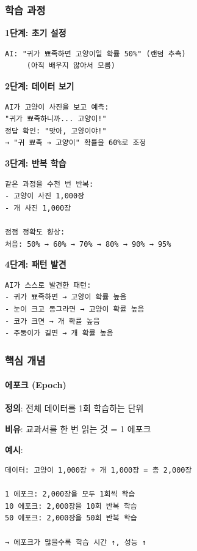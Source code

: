 \documentclass[a4paper, 11pt]{article}
\begin{document}
\hypertarget{uxd559uxc2b5-uxacfcuxc815-1}{%
\subsubsection{학습 과정}\label{uxd559uxc2b5-uxacfcuxc815-1}}

\textbf{1단계: 초기 설정}

\begin{verbatim}
AI: "귀가 뾰족하면 고양이일 확률 50%" (랜덤 추측)
     (아직 배우지 않아서 모름)
\end{verbatim}

\textbf{2단계: 데이터 보기}

\begin{verbatim}
AI가 고양이 사진을 보고 예측:
"귀가 뾰족하니까... 고양이!"
정답 확인: "맞아, 고양이야!"
→ "귀 뾰족 → 고양이" 확률을 60%로 조정
\end{verbatim}

\textbf{3단계: 반복 학습}

\begin{verbatim}
같은 과정을 수천 번 반복:
- 고양이 사진 1,000장
- 개 사진 1,000장

점점 정확도 향상:
처음: 50% → 60% → 70% → 80% → 90% → 95%
\end{verbatim}

\textbf{4단계: 패턴 발견}

\begin{verbatim}
AI가 스스로 발견한 패턴:
- 귀가 뾰족하면 → 고양이 확률 높음
- 눈이 크고 동그라면 → 고양이 확률 높음
- 코가 크면 → 개 확률 높음
- 주둥이가 길면 → 개 확률 높음
\end{verbatim}

\hypertarget{uxd575uxc2ec-uxac1cuxb150-2}{%
\subsubsection{핵심 개념}\label{uxd575uxc2ec-uxac1cuxb150-2}}

\hypertarget{uxc5d0uxd3ecuxd06c-epoch}{%
\paragraph{에포크 (Epoch)}\label{uxc5d0uxd3ecuxd06c-epoch}}

\textbf{정의}: 전체 데이터를 1회 학습하는 단위

\textbf{비유}: 교과서를 한 번 읽는 것 = 1 에포크

\textbf{예시}:

\begin{verbatim}
데이터: 고양이 1,000장 + 개 1,000장 = 총 2,000장

1 에포크: 2,000장을 모두 1회씩 학습
10 에포크: 2,000장을 10회 반복 학습
50 에포크: 2,000장을 50회 반복 학습

→ 에포크가 많을수록 학습 시간 ↑, 성능 ↑
\end{verbatim}
\end{document}
